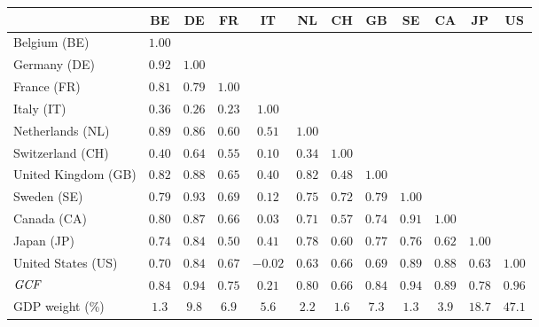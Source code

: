 \footnotesize
\setlength{\tabcolsep}{4pt}
\begin{tabular}{l ccccccccccc}
  \toprule
  & BE & DE & FR & IT & NL & CH & GB & SE & CA & JP & US \\
  \midrule
  Belgium (BE)        & $1.00$ &        &        &        &        &        &        &        &        &        &        \\
  Germany (DE)        & $0.92$ & $1.00$ &        &        &        &        &        &        &        &        &        \\
  France (FR)         & $0.81$ & $0.79$ & $1.00$ &        &        &        &        &        &        &        &        \\
  Italy (IT)          & $0.36$ & $0.26$ & $0.23$ & $1.00$ &        &        &        &        &        &        &        \\
  Netherlands (NL)    & $0.89$ & $0.86$ & $0.60$ & $0.51$ & $1.00$ &        &        &        &        &        &        \\
  Switzerland (CH)    & $0.40$ & $0.64$ & $0.55$ & $0.10$ & $0.34$ & $1.00$ &        &        &        &        &        \\
  United Kingdom (GB) & $0.82$ & $0.88$ & $0.65$ & $0.40$ & $0.82$ & $0.48$ & $1.00$ &        &        &        &        \\
  Sweden (SE)         & $0.79$ & $0.93$ & $0.69$ & $0.12$ & $0.75$ & $0.72$ & $0.79$ & $1.00$ &        &        &        \\
  Canada (CA)         & $0.80$ & $0.87$ & $0.66$ & $0.03$ & $0.71$ & $0.57$ & $0.74$ & $0.91$ & $1.00$ &        &        \\
  Japan (JP)          & $0.74$ & $0.84$ & $0.50$ & $0.41$ & $0.78$ & $0.60$ & $0.77$ & $0.76$ & $0.62$ & $1.00$ &        \\
  United States (US)  & $0.70$ & $0.84$ & $0.67$ & $-0.02$& $0.63$ & $0.66$ & $0.69$ & $0.89$ & $0.88$ & $0.63$ & $1.00$ \\
  \midrule
  $\mathit{GCF}$              & $0.84$ & $0.94$ & $0.75$ & $0.21$ & $0.80$ & $0.66$ & $0.84$ & $0.94$ & $0.89$ & $0.78$ & $0.96$ \\
  GDP weight (\%)     & $1.3$  & $9.8$  & $6.9$  & $5.6$  & $2.2$  & $1.6$  & $7.3$  & $1.3$  & $3.9$  & $18.7$ & $47.1$ \\
  \bottomrule
\end{tabular}

